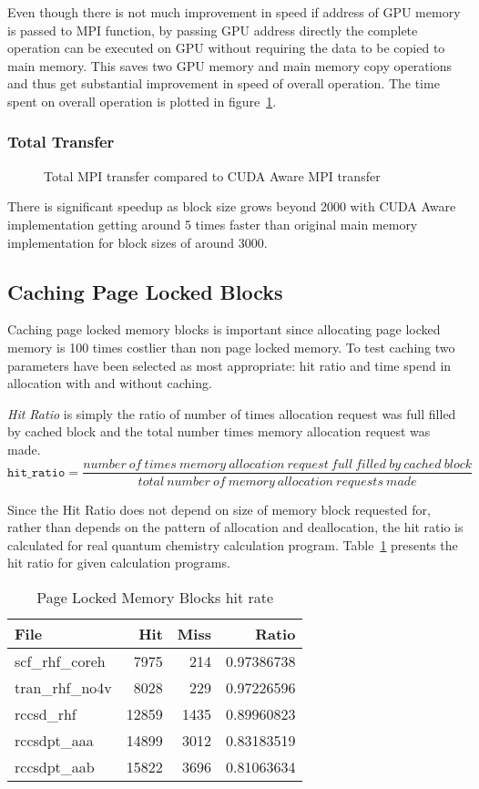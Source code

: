 Even though there is not much improvement in speed if address of GPU memory is
passed to MPI function, by passing GPU address directly the complete operation
can be executed on GPU without requiring the data to be copied to main memory. This
saves two GPU memory and main memory copy operations and thus get substantial improvement
in speed of overall operation. The time spent on overall operation is plotted in
figure~\ref{fig:mempin_rdma_total}.

\subsubsection{Total Transfer}
\begin{figure}[h]
  
  \caption{Total MPI transfer compared to CUDA Aware MPI transfer}
  \label{fig:mempin_rdma_total}
\end{figure}

There is significant speedup as block size grows beyond 2000 with CUDA Aware
implementation getting around 5 times faster than original main memory implementation
for block sizes of around 3000.

\subsection{Caching Page Locked Blocks}
Caching page locked memory blocks is important since allocating page locked memory
is 100 times costlier than non page locked memory. To test caching two parameters
have been selected as most appropriate: hit ratio and time spend in allocation with
and without caching.

\textit{Hit Ratio} is simply the ratio of number of times allocation request was
full filled by cached block and the total number times memory allocation request
was made.
\[
  \texttt{hit\_ratio} = \frac{number~of~times~memory~allocation~request~full~filled~by~cached~block}{total~number~of~memory~allocation~requests~made}
\]

Since the Hit Ratio does not depend on size of memory block requested for, rather
than depends on the pattern of allocation and deallocation, the hit ratio is calculated
for real quantum chemistry calculation program. Table~\ref{tab:mempin_hitrate}
presents the hit ratio for given calculation programs.

\begin{table}[h]
  \centering
  \begin{tabular}{l | r | r | r}
    \hline
    File            & Hit   & Miss & Ratio      \\
    \hline
    scf\_rhf\_coreh &  7975 &  214 & 0.97386738 \\
    tran\_rhf\_no4v &  8028 &  229 & 0.97226596 \\
    rccsd\_rhf      & 12859 & 1435 & 0.89960823 \\
    rccsdpt\_aaa    & 14899 & 3012 & 0.83183519 \\
    rccsdpt\_aab    & 15822 & 3696 & 0.81063634 \\
    \hline
  \end{tabular}
  \caption{Page Locked Memory Blocks hit rate}
  \label{tab:mempin_hitrate}
\end{table}

